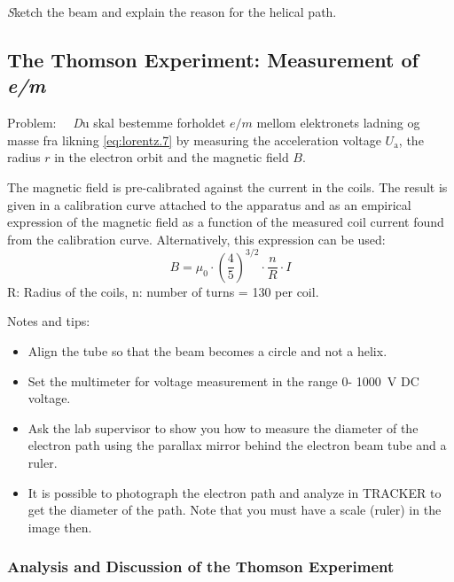 \documentclass[../Elmag-labhefte-2020.tex]{subfiles}
\begin{document}
{\emph Sketch the beam and explain the reason for the helical path.}

\subsection{The Thomson Experiment: Measurement of \textsl{e/m}}

Problem: \ \
{\emph Du skal bestemme forholdet $e/m$ mellom elektronets ladning og masse fra likning \eqref{eq:lorentz.7} by measuring the acceleration voltage $U_\mathrm{a}$, the radius $r$ in the electron orbit and the magnetic field $B$.}

The magnetic field is pre-calibrated against the current in the coils. The result is given in a calibration curve attached to the apparatus and as an empirical expression of the magnetic field as a function of the measured coil current found from the calibration curve. Alternatively, this expression can be used:
\begin{equation}
    B=\mu_0 \cdot (\frac{4}{5})^{3/2}\cdot \frac{n}{R} \cdot I
\end{equation}
R: Radius of the coils, n: number of turns = 130 per coil.

Notes and tips:
\vspace{-4mm}
\begin{itemize}
    \item Align the tube so that the beam becomes a circle and not a helix.
    \item Set the multimeter for voltage measurement in the range 0- \SI{1000}{\volt} DC voltage.
    \item Ask the lab supervisor to show you how to measure the diameter of the electron path using the parallax mirror behind the electron beam tube and a ruler.
    \item It is possible to photograph the electron path and analyze in TRACKER to get the diameter of the path. Note that you must have a scale (ruler) in the image then.
\end{itemize}

\subsubsection{Analysis and Discussion of the Thomson Experiment}
\end{document}
